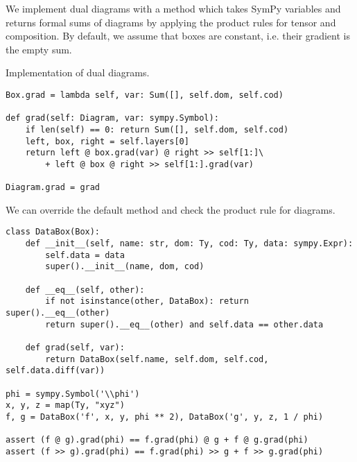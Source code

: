 We implement dual diagrams with a method  which takes SymPy variables and returns formal sums of diagrams by applying the product rules for tensor and composition.
By default, we assume that boxes are constant, i.e. their gradient is the empty sum.

\begin{python}
{\normalfont Implementation of dual diagrams.}

\begin{verbatim}
Box.grad = lambda self, var: Sum([], self.dom, self.cod)

def grad(self: Diagram, var: sympy.Symbol):
    if len(self) == 0: return Sum([], self.dom, self.cod)
    left, box, right = self.layers[0]
    return left @ box.grad(var) @ right >> self[1:]\
        + left @ box @ right >> self[1:].grad(var)

Diagram.grad = grad
\end{verbatim}
\end{python}

\begin{example}
We can override the default  method and check the product rule for diagrams.

\begin{verbatim}
class DataBox(Box):
    def __init__(self, name: str, dom: Ty, cod: Ty, data: sympy.Expr):
        self.data = data
        super().__init__(name, dom, cod)

    def __eq__(self, other):
        if not isinstance(other, DataBox): return super().__eq__(other)
        return super().__eq__(other) and self.data == other.data

    def grad(self, var):
        return DataBox(self.name, self.dom, self.cod, self.data.diff(var))

phi = sympy.Symbol('\\phi')
x, y, z = map(Ty, "xyz")
f, g = DataBox('f', x, y, phi ** 2), DataBox('g', y, z, 1 / phi)

assert (f @ g).grad(phi) == f.grad(phi) @ g + f @ g.grad(phi)
assert (f >> g).grad(phi) == f.grad(phi) >> g + f >> g.grad(phi)
\end{verbatim}
\end{example}
